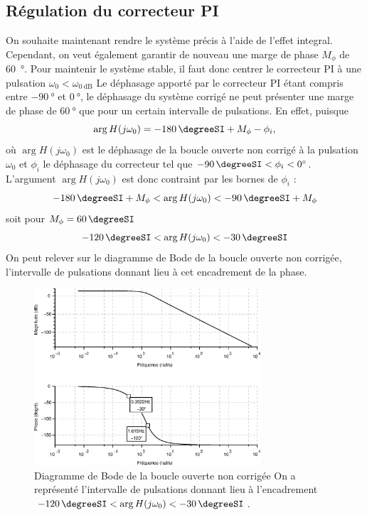 \subsection*{Régulation du correcteur PI}
On souhaite maintenant rendre le système précis à l'aide de l'effet integral.
Cependant, on veut également garantir de nouveau une marge de phase $M_\phi$ de 
\SI{60}{\degree}. Pour maintenir le système stable, il faut donc centrer le 
correcteur PI à une pulsation $\omega_0<\omega_{\SI{0}{\dB}}$
Le déphasage apporté par le correcteur PI étant compris entre 
$\SI{-90}{\degree}$ et $\SI{0}{\degree}$, le déphasage du système 
corrigé ne peut présenter une marge de phase de $\SI{60}{\degree}$ que pour 
un certain intervalle de pulsations. En effet, puisque
\[
    \arg{H(j\omega_0)}=\SI{-180}{\degreeSI}+M_\phi-\phi_i,
\]
où $\arg{H(j\omega_0)}$ est le déphasage de la boucle ouverte non 
corrigé à la pulsation $\omega_0$ et $\phi_i$ le déphasage du 
correcteur tel que $\SI{-90}{\degreeSI}<\phi_i<\SI{0}{\degree}$. 
L'argument $\arg{H(j\omega_0)}$ est donc contraint par les 
bornes de $\phi_i$ :
\[
    \SI{-180}{\degreeSI}+M_\phi<\arg{H(j\omega_0)}<\SI{-90}{\degreeSI}+M_\phi
\]
soit pour $M_\phi=\SI{60}{\degreeSI}$
\[
    \SI{-120}{\degreeSI}<\arg{H(j\omega_0)}<\SI{-30}{\degreeSI}
\]
On peut relever sur le diagramme de Bode de la boucle ouverte non corrigée,
l'intervalle de pulsations donnant lieu à cet encadrement de la phase.
\begin{figure}
    \centering
    \includegraphics[width=0.75\textwidth]{fig/chap_correction/bode_BONC_3.eps}
    \caption{Diagramme de Bode de la boucle ouverte non corrigée
             On a représenté l'intervalle de pulsations donnant 
             lieu à l'encadrement
             $\SI{-120}{\degreeSI}<\arg{H(j\omega_0)}<\SI{-30}{\degreeSI}$.}
\end{figure}
